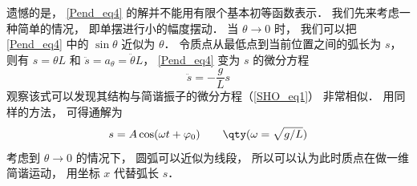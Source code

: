遗憾的是， \autoref{Pend_eq4} 的解并不能用有限个基本初等函数表示． 我们先来考虑一种简单的情况， 即单摆进行小的幅度摆动． 当 $\theta \to 0$ 时， 我们可以把\autoref{Pend_eq4} 中的 $\sin\theta$ 近似为 $\theta$． 令质点从最低点到当前位置之间的弧长为 $s$， 则有 $s = \theta L$ 和 $\ddot s = a_\theta = \ddot\theta L$， \autoref{Pend_eq4} 变为 $s$ 的微分方程
\begin{equation}
\ddot s = - \frac gL s
\end{equation}
观察该式可以发现其结构与简谐振子的微分方程（\autoref{SHO_eq1}） 非常相似． 用同样的方法， 可得通解为
\begin{equation}\label{SHO_eq2}
s = A\cos(\omega t + \varphi _0)  \qquad \qty(\omega  = \sqrt {g/L})
\end{equation}
考虑到 $\theta \to 0$ 的情况下， 圆弧可以近似为线段， 所以可以认为此时质点在做一维简谐运动， 用坐标 $x$ 代替弧长 $s$．




